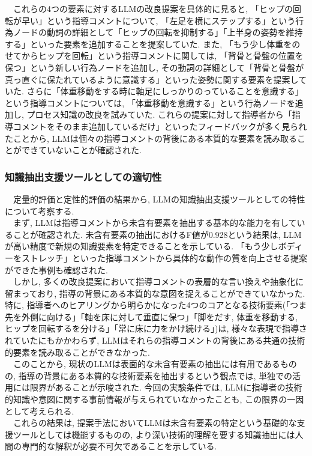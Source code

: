 　これらの4つの要素に対するLLMの改良提案を具体的に見ると, 「ヒップの回転が早い」という指導コメントについて, 「左足を横にステップする」という行為ノードの動詞の詳細として「ヒップの回転を抑制する」「上半身の姿勢を維持する」といった要素を追加することを提案していた. また, 「もう少し体重をのせてからヒップを回転」という指導コメントに関しては, 「背骨と骨盤の位置を保つ」という新しい行為ノードを追加し, その動詞の詳細として「背骨と骨盤が真っ直ぐに保たれているように意識する」といった姿勢に関する要素を提案していた. さらに「体重移動をする時に軸足にしっかりのっていることを意識する」という指導コメントについては, 「体重移動を意識する」という行為ノードを追加し, プロセス知識の改良を試みていた. これらの提案に対して指導者から「指導コメントをそのまま追加しているだけ」といったフィードバックが多く見られたことから, LLMは個々の指導コメントの背後にある本質的な要素を読み取ることができていないことが確認された. \\

\subsubsection{知識抽出支援ツールとしての適切性}
　定量的評価と定性的評価の結果から, LLMの知識抽出支援ツールとしての特性について考察する. \\
　まず, LLMは指導コメントから未含有要素を抽出する基本的な能力を有していることが確認された. 未含有要素の抽出におけるF値が0.928という結果は, LLMが高い精度で新規の知識要素を特定できることを示している. 「もう少しボディーをストレッチ」といった指導コメントから具体的な動作の質を向上させる提案ができた事例も確認された. \\
　しかし, 多くの改良提案において指導コメントの表層的な言い換えや抽象化に留まっており, 指導の背景にある本質的な意図を捉えることができていなかった. 特に, 指導者へのヒアリングから明らかになった4つのコアとなる技術要素(「つま先を外側に向ける」「軸を床に対して垂直に保つ」「脚をだす, 体重を移動する, ヒップを回転するを分ける」「常に床に力をかけ続ける」)は, 様々な表現で指導されていたにもかかわらず, LLMはそれらの指導コメントの背後にある共通の技術的要素を読み取ることができなかった. \\
　このことから, 現状のLLMは表面的な未含有要素の抽出には有用であるものの, 指導の背景にある本質的な技術要素を抽出するという観点では, 単独での活用には限界があることが示唆された. 今回の実験条件では, LLMに指導者の技術的知識や意図に関する事前情報が与えられていなかったことも, この限界の一因として考えられる. \\
　これらの結果は, 提案手法においてLLMは未含有要素の特定という基礎的な支援ツールとしては機能するものの, より深い技術的理解を要する知識抽出には人間の専門的な解釈が必要不可欠であることを示している. \\



